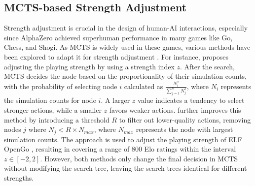 \subsection{MCTS-based Strength Adjustment}
\label{subsec:bg_mcts_sa}
Strength adjustment \citep{hunicke_ai_2004, paulsen_moderately_2010, silva_dynamic_2015, moon_dynamic_2020} is crucial in the design of human-AI interactions, especially since AlphaZero achieved superhuman performance in many games like Go, Chess, and Shogi.
As MCTS is widely used in these games, various methods have been explored to adapt it for strength adjustment \citep{sephton_experimental_2015, wu_strength_2019, demediuk_monte_2017, fan_position_2019, moon_diversifying_2022}.
For instance, \citet{sephton_experimental_2015} proposes adjusting the playing strength by using a strength index $z$.
After the search, MCTS decides the node based on the proportionality of their simulation counts, with the probability of selecting node $i$ calculated as $\frac{N_i^z}{\sum_{j=1}^{n}N_j^z}$, where $N_i$ represents the simulation counts for node $i$.
A larger $z$ value indicates a tendency to select stronger actions, while a smaller $z$ favors weaker actions.
\citet{wu_strength_2019} further improves this method by introducing a threshold $R$ to filter out lower-quality actions, removing nodes $j$ where $N_j<R\times N_{max}$, where $N_{max}$ represents the node with largest simulation counts.
The approach is used to adjust the playing strength of ELF OpenGo \citep{tian_elf_2019}, resulting in covering a range of 800 Elo ratings within the interval $z\in[-2,2]$.
However, both methods only change the final decision in MCTS without modifying the search tree, leaving the search trees identical for different strengths.


